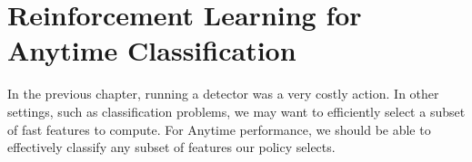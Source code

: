 \chapter{Reinforcement Learning for Anytime Classification}\label{sec:clf_chapter}

In the previous chapter, running a detector was a very costly action.
In other settings, such as classification problems, we may want to efficiently select a subset of fast features to compute.
For Anytime performance, we should be able to effectively classify any subset of features our policy selects.






